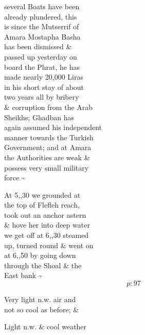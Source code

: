 \documentclass{report}
\begin{document}
	\par{
 	several Boats have been\ \\already plundered, this\ \\is since the Mutserrif of\ \\Amara Mostapha Basha\ \\has been dismissed \&\ \\passed up yesterday on\ \\board the Phrat, he has\ \\made nearly 20,000 Liras\ \\in his short stay of about\ \\two years all by bribery\ \\\& corruption from the Arab\ \\Sheikhs; Ghadban has\ \\again assumed his independent\ \\manner towards the Turkish\ \\Government; and at Amara\ \\the Authorities are weak \&\ \\possess very small military\ \\force \~{}\ \\
	}

	\par{
 	At 5,,30 we grounded at\ \\the top of Flefleh reach,\ \\took out an anchor astern\ \\\& hove her into deep water\ \\we get off at 6,,30 steamed\ \\up, turned round \& went on\ \\at 6,,50 by going down\ \\through the Shoal \& the\ \\East bank \~{}\ \\
  \[p: 97 \]

	}



	\par{
 	Very light n.w. air and\ \\not so cool as before; \&\ \\
	}

	\par{
 	Light n.w. \& cool weather\ \\
	}
\end{document}
